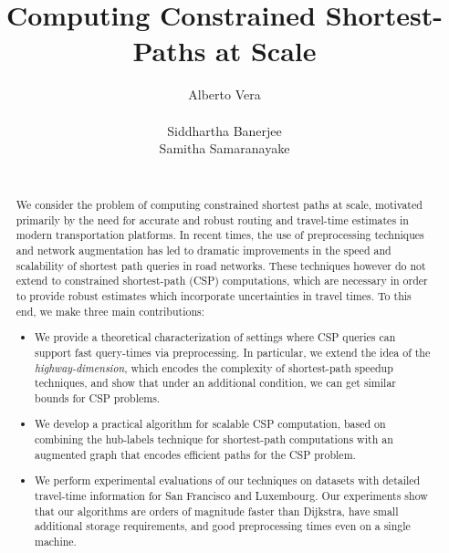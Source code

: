 \documentclass{vldb}
\begin{document}

\title{Computing Constrained Shortest-Paths at Scale}




\author{
\alignauthor
Alberto Vera\\
\\
\alignauthor
Siddhartha Banerjee
\\
\alignauthor
Samitha Samaranayake          \\               
\\
}

\maketitle

\begin{abstract}
We consider the problem of computing constrained shortest paths at scale, motivated primarily by the need for accurate and robust routing and travel-time estimates in modern transportation platforms. 
In recent times, the use of preprocessing techniques and network augmentation has led to dramatic improvements in the speed and scalability of shortest path queries in road networks.
These techniques however do not extend to constrained shortest-path (CSP) computations, which are necessary in order to provide robust estimates which incorporate uncertainties in travel times.
To this end, we make three main contributions: 
\begin{itemize}[nosep,leftmargin=*]
\item We provide a theoretical characterization of settings where CSP queries can support fast query-times via preprocessing. In particular, we extend the idea of the \emph{highway-dimension}, which encodes the complexity of shortest-path speedup techniques, and show that under an additional condition, we can get similar bounds for CSP problems.
\item We develop a practical algorithm for scalable CSP computation, based on combining the hub-labels technique for shortest-path computations with an augmented graph that encodes efficient paths for the CSP problem.
\item We perform experimental evaluations of our techniques on datasets with detailed travel-time information for San Francisco and Luxembourg. Our experiments show that our algorithms are orders of magnitude faster than Dijkstra, have small additional storage requirements, and good preprocessing times even on a single machine. 
\end{itemize}	
\end{abstract}
\end{document}
